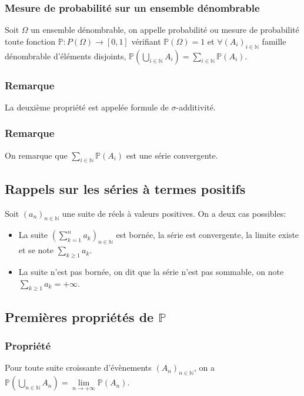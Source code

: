 \documentclass[a4paper,10pt]{book} %
\newcommand{\N}{\mathbb{N}}
\renewcommand{\P}{\mathbb{P}} %
\begin{document}
\subsubsection{Mesure de probabilité sur un ensemble dénombrable}
Soit $\Omega$ un ensemble dénombrable, on appelle probabilité ou mesure de probabilité toute fonction $\P : P(\Omega)\rightarrow [0,1]$ vérifiant $\P(\Omega)=1$ et $\forall (A_i)_{i\in \N}$ famille dénombrable d'éléments disjoints, $\displaystyle\P(\bigcup_{i\in \N} A_i)=\sum_{i\in \N}\P(A_i)$.

\subsubsection{Remarque}
La deuxième propriété est appelée formule de $\sigma$-additivité.

\subsubsection{Remarque}
On remarque que $\displaystyle \sum_{i\in \N} \P(A_i)$ est une série convergente.

\subsection{Rappels sur les séries à termes positifs}
Soit $(a_n)_{n\in \N}$ une suite de réels à valeurs positives. On a deux cas possibles:
\begin{itemize}
\item La suite $\displaystyle (\sum_{k=1}^n a_k)_{n\in \N}$ est bornée, la série est convergente, la limite existe et se note $\displaystyle \sum_{k\geq 1}a_k$.
\item La suite n'est pas bornée, on dit que la série n'est pas sommable, on note $\displaystyle \sum_{k\geq 1}a_k=+\infty$.
\end{itemize}

\subsection{Premières propriétés de $\P$}
\subsubsection{Propriété}\label{prop1.4.1}
Pour toute suite croissante d'évènements $(A_n)_{n\in \N}$, on a $\displaystyle \P(\bigcup_{n\in \N} A_n)=\lim\limits_{n\rightarrow +\infty} \P(A_n)$.\\
\end{document}
